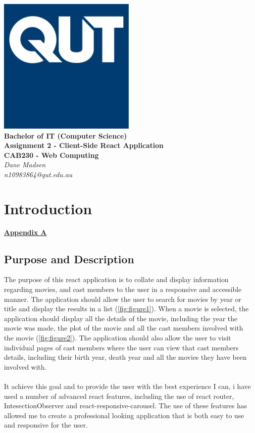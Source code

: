 \documentclass[12pt,a4paper]{article}
\begin{document}
	\begin{titlepage}
		
		\begin{center}
			\includegraphics[width=0.5\textwidth]{QUT.jpg}\\
			[0.03\textheight]  
			\Large\textbf{Bachelor of IT (Computer Science)}\\
			\Large\textbf{Assignment 2 - Client-Side React Application}\\
			\large\textbf{CAB230 - Web Computing}\\
			[0.02\textheight]
			\large\textsl{Dane Madsen}\\
			\large\textsl{n10983864@qut.edu.au}
		\end{center}
		
	\end{titlepage}
	\tableofcontents
	\newpage
	
	\section{Introduction}
		\hyperref[subsec:appendixA]{\textbf{Appendix A}}
		\subsection{Purpose and Description}
			The purpose of this react application is to collate and display information regarding movies, 
			and cast members to the user in a responsive and accessible manner. The application should 
			allow the user to search for movies by year or title and display the results in a list (\cref{fig:figure1}).  
			When a movie is selected, the application should display all the details of the movie, 
			including the year the movie was made, the plot of the movie and all the cast members 
			involved with the movie (\cref{fig:figure2}). The application should also allow the user to visit individual 
			pages of cast members where the user can view that cast members details, including their 
			birth year, death year and all the movies they have been involved with.\\
			\\
			It achieve this goal and to provide the user with the best experience I can, i have used a 
			number of advanced react features, including the use of react router, IntesectionObserver and 
			react-responsive-carousel. The use of these features has allowed me to create a 
			professional looking application that is both easy to use and responsive for the user.\\
		
\end{document}
